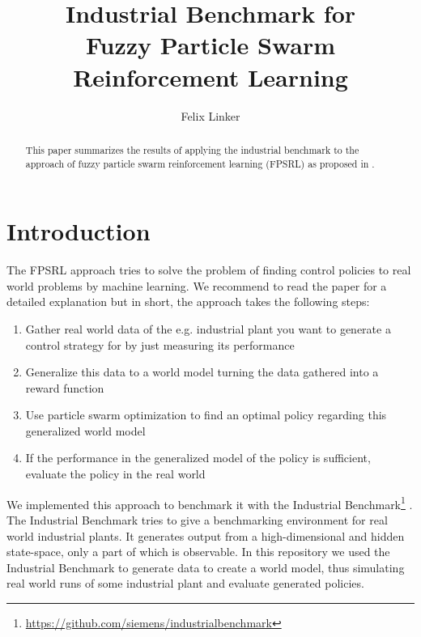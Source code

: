 \documentclass[runningheads]{llncs}
\begin{document}
    \title{Industrial Benchmark for \\Fuzzy Particle Swarm Reinforcement Learning}

    \author{Felix Linker}



    \maketitle
    \begin{abstract}
        This paper summarizes the results of applying the industrial benchmark to the approach of fuzzy particle swarm reinforcement learning (FPSRL) as proposed in \cite{Hein2017}.
    \end{abstract}


    \section{Introduction}

    The FPSRL approach tries to solve the problem of finding control policies to real world problems by machine learning.
    We recommend to read the paper for a detailed explanation but in short, the approach takes the following steps:

    \begin{enumerate}
        \item Gather real world data of the e.g. industrial plant you want to generate a control strategy for by just measuring its performance
        \item Generalize this data to a world model turning the data gathered into a reward function
        \item Use particle swarm optimization to find an optimal policy regarding this generalized world model
        \item If the performance in the generalized model of the policy is sufficient, evaluate the policy in the real world
    \end{enumerate}

    We implemented this approach to benchmark it with the Industrial Benchmark\footnote{\url{https://github.com/siemens/industrialbenchmark}} \cite{Hein2017a}.
    The Industrial Benchmark tries to give a benchmarking environment for real world industrial plants.
    It generates output from a high-dimensional and hidden state-space, only a part of which is observable.
    In this repository we used the Industrial Benchmark to generate data to create a world model, thus simulating real world runs of some industrial plant and evaluate generated policies.
\end{document}
